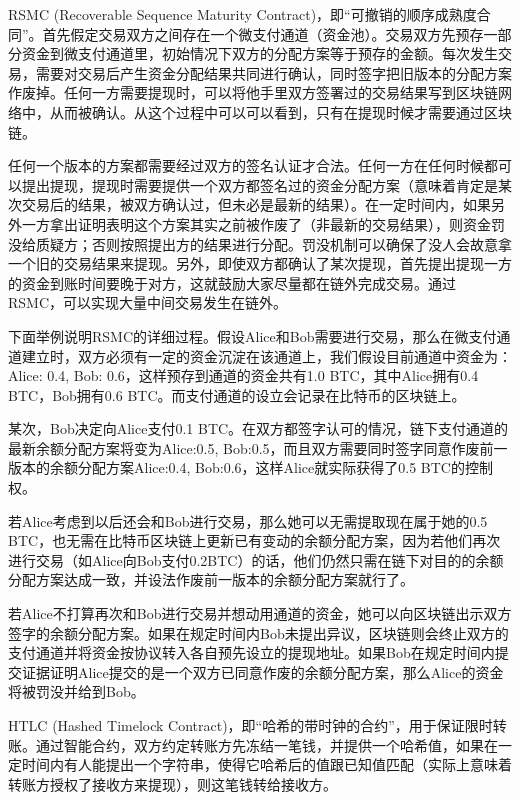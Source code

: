 \documentclass[12pt,a4paper]{article}
\begin{document}
RSMC (Recoverable Sequence Maturity Contract)，即“可撤销的顺序成熟度合同”。首先假定交易双方之间存在一个微支付通道（资金池）。交易双方先预存一部分资金到微支付通道里，初始情况下双方的分配方案等于预存的金额。每次发生交易，需要对交易后产生资金分配结果共同进行确认，同时签字把旧版本的分配方案作废掉。任何一方需要提现时，可以将他手里双方签署过的交易结果写到区块链网络中，从而被确认。从这个过程中可以可以看到，只有在提现时候才需要通过区块链。

任何一个版本的方案都需要经过双方的签名认证才合法。任何一方在任何时候都可以提出提现，提现时需要提供一个双方都签名过的资金分配方案（意味着肯定是某次交易后的结果，被双方确认过，但未必是最新的结果）。在一定时间内，如果另外一方拿出证明表明这个方案其实之前被作废了（非最新的交易结果），则资金罚没给质疑方；否则按照提出方的结果进行分配。罚没机制可以确保了没人会故意拿一个旧的交易结果来提现。另外，即使双方都确认了某次提现，首先提出提现一方的资金到账时间要晚于对方，这就鼓励大家尽量都在链外完成交易。通过 RSMC，可以实现大量中间交易发生在链外。

下面举例说明RSMC的详细过程。假设Alice和Bob需要进行交易，那么在微支付通道建立时，双方必须有一定的资金沉淀在该通道上，我们假设目前通道中资金为：Alice: 0.4, Bob: 0.6，这样预存到通道的资金共有1.0 BTC，其中Alice拥有0.4 BTC，Bob拥有0.6 BTC。而支付通道的设立会记录在比特币的区块链上。

某次，Bob决定向Alice支付0.1 BTC。在双方都签字认可的情况，链下支付通道的最新余额分配方案将变为{Alice:0.5, Bob:0.5}，而且双方需要同时签字同意作废前一版本的余额分配方案{Alice:0.4, Bob:0.6}，这样Alice就实际获得了0.5 BTC的控制权。

若Alice考虑到以后还会和Bob进行交易，那么她可以无需提取现在属于她的0.5 BTC，也无需在比特币区块链上更新已有变动的余额分配方案，因为若他们再次进行交易（如Alice向Bob支付0.2BTC）的话，他们仍然只需在链下对目的的余额分配方案达成一致，并设法作废前一版本的余额分配方案就行了。

若Alice不打算再次和Bob进行交易并想动用通道的资金，她可以向区块链出示双方签字的余额分配方案。如果在规定时间内Bob未提出异议，区块链则会终止双方的支付通道并将资金按协议转入各自预先设立的提现地址。如果Bob在规定时间内提交证据证明Alice提交的是一个双方已同意作废的余额分配方案，那么Alice的资金将被罚没并给到Bob。

HTLC (Hashed Timelock Contract)，即“哈希的带时钟的合约”，用于保证限时转账。通过智能合约，双方约定转账方先冻结一笔钱，并提供一个哈希值，如果在一定时间内有人能提出一个字符串，使得它哈希后的值跟已知值匹配（实际上意味着转账方授权了接收方来提现），则这笔钱转给接收方。
\end{document}
